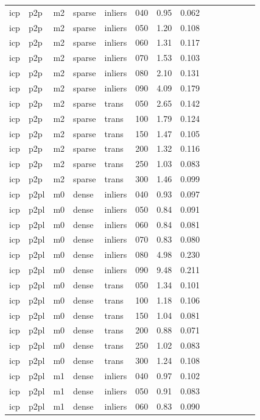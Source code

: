 \begin{table}[htbp]
\begin{tabular}{llllllrrrrrrrr}
  icp & p2p & m2 & sparse & inliers & 040 & 0.95 & 0.062 \\
  icp & p2p & m2 & sparse & inliers & 050 & 1.20 & 0.108 \\
  icp & p2p & m2 & sparse & inliers & 060 & 1.31 & 0.117 \\
  icp & p2p & m2 & sparse & inliers & 070 & 1.53 & 0.103 \\
  icp & p2p & m2 & sparse & inliers & 080 & 2.10 & 0.131 \\
  icp & p2p & m2 & sparse & inliers & 090 & 4.09 & 0.179 \\
  icp & p2p & m2 & sparse & trans & 050 & 2.65 & 0.142 \\
  icp & p2p & m2 & sparse & trans & 100 & 1.79 & 0.124 \\
  icp & p2p & m2 & sparse & trans & 150 & 1.47 & 0.105 \\
  icp & p2p & m2 & sparse & trans & 200 & 1.32 & 0.116 \\
  icp & p2p & m2 & sparse & trans & 250 & 1.03 & 0.083 \\
  icp & p2p & m2 & sparse & trans & 300 & 1.46 & 0.099 \\
  icp & p2pl & m0 & dense & inliers & 040 & 0.93 & 0.097 \\
  icp & p2pl & m0 & dense & inliers & 050 & 0.84 & 0.091 \\
  icp & p2pl & m0 & dense & inliers & 060 & 0.84 & 0.081 \\
  icp & p2pl & m0 & dense & inliers & 070 & 0.83 & 0.080 \\
  icp & p2pl & m0 & dense & inliers & 080 & 4.98 & 0.230 \\
  icp & p2pl & m0 & dense & inliers & 090 & 9.48 & 0.211 \\
  icp & p2pl & m0 & dense & trans & 050 & 1.34 & 0.101 \\
  icp & p2pl & m0 & dense & trans & 100 & 1.18 & 0.106 \\
  icp & p2pl & m0 & dense & trans & 150 & 1.04 & 0.081 \\
  icp & p2pl & m0 & dense & trans & 200 & 0.88 & 0.071 \\
  icp & p2pl & m0 & dense & trans & 250 & 1.02 & 0.083 \\
  icp & p2pl & m0 & dense & trans & 300 & 1.24 & 0.108 \\
  icp & p2pl & m1 & dense & inliers & 040 & 0.97 & 0.102 \\
  icp & p2pl & m1 & dense & inliers & 050 & 0.91 & 0.083 \\
  icp & p2pl & m1 & dense & inliers & 060 & 0.83 & 0.090 \\

\end{tabular}
\end{table}
